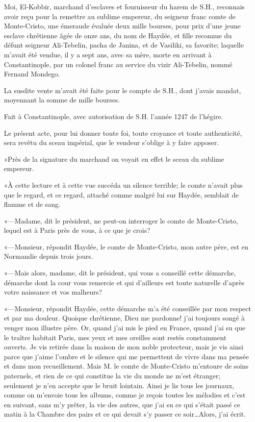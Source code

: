 \begin{mail}{}{}
	Moi, El-Kobbir, marchand d'esclaves et fournisseur du harem de S.H., reconnais avoir reçu pour la remettre au sublime empereur, du seigneur franc comte de Monte-Cristo, une émeraude évaluée deux mille bourses, pour prix d'une jeune esclave chrétienne âgée de onze ans, du nom de Haydée, et fille reconnue du défunt seigneur Ali-Tebelin, pacha de Janina, et de Vasiliki, sa favorite; laquelle m'avait été vendue, il y a sept ans, avec sa mère, morte en arrivant à Constantinople, par un colonel franc au service du vizir Ali-Tebelin, nommé Fernand Mondego.
	
La susdite vente m'avait été faite pour le compte de S.H., dont j'avais mandat, moyennant la somme de mille bourses.

Fait à Constantinople, avec autorisation de S.H. l'année 1247 de l'hégire.


Le présent acte, pour lui donner toute foi, toute croyance et toute authenticité, sera revêtu du sceau impérial, que le vendeur s'oblige à y faire apposer.

\end{mail}

«Près de la signature du marchand on voyait en effet le sceau du sublime empereur. 

«À cette lecture et à cette vue succéda un silence terrible; le comte n'avait plus que le regard, et ce regard, attaché comme malgré lui sur Haydée, semblait de flamme et de sang. 

«—Madame, dit le président, ne peut-on interroger le comte de Monte-Cristo, lequel est à Paris près de vous, à ce que je crois? 

«—Monsieur, répondit Haydée, le comte de Monte-Cristo, mon autre père, est en Normandie depuis trois jours. 

«—Mais alors, madame, dit le président, qui vous a conseillé cette démarche, démarche dont la cour vous remercie et qui d'ailleurs est toute naturelle d'après votre naissance et vos malheurs? 

«—Monsieur, répondit Haydée, cette démarche m'a été conseillée par mon respect et par ma douleur. Quoique chrétienne, Dieu me pardonne! j'ai toujours songé à venger mon illustre père. Or, quand j'ai mis le pied en France, quand j'ai su que le traître habitait Paris, mes yeux et mes oreilles sont restés constamment ouverts. Je vis retirée dans la maison de mon noble protecteur, mais je vis ainsi parce que j'aime l'ombre et le silence qui me permettent de vivre dans ma pensée et dans mon recueillement. Mais M. le comte de Monte-Cristo m'entoure de soins paternels, et rien de ce qui constitue la vie du monde ne m'est étranger; seulement je n'en accepte que le bruit lointain. Ainsi je lis tous les journaux, comme on m'envoie tous les albums, comme je reçois toutes les mélodies et c'est en suivant, sans m'y prêter, la vie des autres, que j'ai su ce qui s'était passé ce matin à la Chambre des pairs et ce qui devait s'y passer ce soir\dots Alors, j'ai écrit. 

